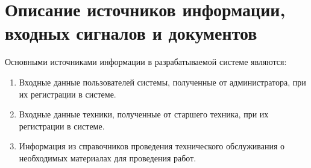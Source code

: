 \documentclass[../nirs.tex]{subfiles}
\begin{document}
\section{Описание источников информации, входных сигналов и документов}
Основными источниками информации в разрабатываемой системе являются:
\begin{enumerate}

	\item Входные данные пользователей системы, полученные от администратора,
		при их регистрации в системе.

	\item Входные данные техники, полученные от старшего техника, при их
		регистрации в системе.

	\item Информация из справочников проведения технического обслуживания о
		необходимых материалах для проведения работ.

\end{enumerate} 
\end{document}
